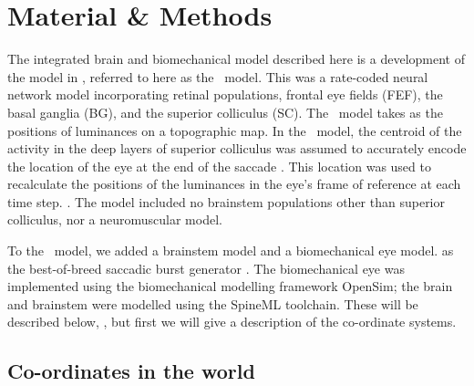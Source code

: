 \documentclass{frontiersSCNS}
\begin{document}
\section{Material \& Methods} \label{sec:methods}

The integrated brain and biomechanical model described here is a
development of the model in \cite{cope_basal_2017}, referred to here
as the \ccg~model. This was a rate-coded neural network model
incorporating retinal populations, frontal eye fields (FEF), the basal
ganglia (BG), and the superior colliculus (SC).  The \ccg~model takes
as  the positions of luminances  on a topographic map.   In the \ccg~model, the
centroid of the activity in the deep layers of superior colliculus was
assumed to accurately encode the location of the eye at the end of the
saccade
\citep{wurtz_activity_1972,robinson_eye_1972,van_gisbergen_collicular_1987,mcilwain_lateral_1982}.  This location was used to
recalculate the positions of the luminances in the eye's frame of
reference at each time step. .  The model
included no brainstem populations other than superior colliculus, nor
a neuromuscular model.

To the \ccg~model, we added a brainstem model and a biomechanical eye
model.  \citep{gancarz_neural_1998} as the best-of-breed saccadic
burst generator \citep{girard_brainstem_2005}.  The biomechanical eye
was implemented using the biomechanical modelling framework OpenSim;
the brain and brainstem were modelled using the SpineML toolchain.
These will be described below, , but first we will give a description of the
co-ordinate systems.

\subsection{Co-ordinates in the world} \label{sec:methods:coords}
\end{document}
